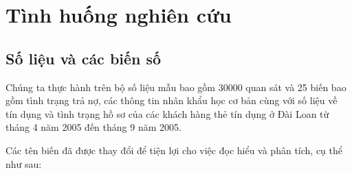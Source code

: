 \documentclass[a4paper]{report}\usepackage[]{graphicx}\usepackage[]{color}
\begin{document}

\chapter{Tình huống nghiên cứu}

\section{Số liệu và các biến số}

Chúng ta thực hành trên bộ số liệu mẫu bao gồm 30000 quan sát và 25 biến bao gồm tình trạng trả nợ, các thông tin nhân khẩu học cơ bản cùng với số liệu về tín dụng và tình trạng hồ sơ của các khách hàng thẻ tín dụng ở Đài Loan từ tháng 4 năm 2005 đến tháng 9 năm 2005.

Các tên biến đã được thay đổi để tiện lợi cho việc đọc hiểu và phân tích, cụ thể như sau:
\end{document}
